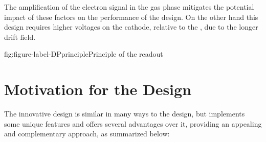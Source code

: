 The amplification of the electron signal in the gas phase mitigates the potential impact of these factors on the performance of the \dual design.  On the other hand this design requires  higher voltages on the cathode, relative to the \single, due to the longer drift field. 


\begin{dunefigure}{fig:figure-label-DPprinciple}{Principle of the \dual readout}
\end{dunefigure}

\section{Motivation for the \dual {} Design} %
\label{sec:fddp-design-motivation}


The innovative \dual design is similar in many ways to the \single design, but implements some unique features and offers several advantages over it, providing an appealing and complementary approach, as summarized below:


